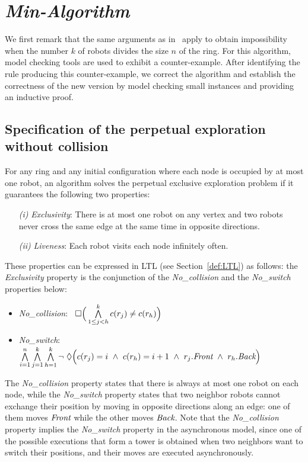 	\chapter{\emph{Min-Algorithm}}
	\label{sec:min}
We first remark that the same arguments as in~\cite{flocchini_computing_2007} 
apply to obtain impossibility when the number $k$ of robots divides 
the size $n$ of the ring. 
For this algorithm, model checking tools are used to exhibit a
counter-example.  After identifying the rule producing this
counter-example, we correct the algorithm and establish the
correctness of the new version by model checking small instances and
providing an inductive proof.

	\section{Specification of the perpetual exploration without collision}
	\label{subsub:perpexp} 
For any ring and any initial configuration
where each node is occupied by at most one robot, an algorithm solves
the perpetual exclusive exploration problem if it guarantees the
following two properties: 
\begin{itemize}%
\item[\emph{(i)}] \emph{Exclusivity}: There is at most one robot on
  any vertex and two robots never  cross the same edge at the same
  time in opposite directions.
\item[\emph{(ii)}] \emph{Liveness}: Each robot visits each node 
infinitely often.
\end{itemize}
These properties can be expressed in \textsf{LTL} (see Section~\ref{def:LTL}) as follows: the
\emph{Exclusivity} property is the conjunction of the
\emph{No\_collision} and the \emph{No\_switch} properties below: 
\begin{itemize}%
\item
 \emph{No\_collision}: ~$\Box\Big(\bigwedge\limits_{1\leq j<h}^k c(r_j) \neq c(r_{h})\Big)$
\item
  \emph{No\_switch}: ~$\bigwedge\limits_{i=1}^n\bigwedge\limits_{\substack{j=1}}^k
\bigwedge\limits_{\substack{h=1}}^k\neg~\Diamond
  \Big(c(r_j)=i~\wedge~c(r_h)=i+1~\wedge~r_j.\textit{Front}~\wedge~r_{h}.
\textit{Back}\Big)$
\end{itemize}
The \emph{No\_collision} property states that there is always at most
one robot on each node, while the \emph{No\_switch} property states
that two neighbor robots cannot exchange their position by moving in
opposite directions along an edge: one of them moves $\textit{Front}$
while the other moves $\textit{Back}$.  Note that the
\emph{No\_collision} property implies the \emph{No\_switch} property
in the asynchronous model, since one of the possible executions that
form a tower is obtained when two neighbors want to switch their
positions, and their moves are executed asynchronously.

